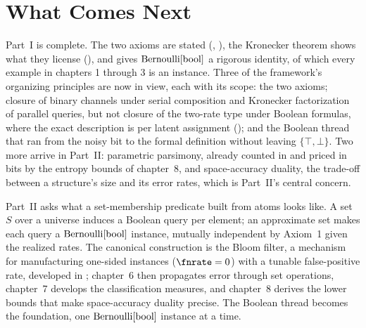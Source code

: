 %

\section{What Comes Next}
\label{sec:what-comes-next}

Part~I is complete. The two axioms are stated (,
), the Kronecker theorem shows what they license
(), and  gives
$\mathrm{Bernoulli}[\mathrm{bool}]$ a rigorous identity, of which every example in chapters
1 through 3 is an instance. Three of the framework's organizing principles are
now in view, each with its scope: the two axioms; closure of binary channels
under serial composition and Kronecker factorization of parallel queries, but
not closure of the two-rate type under Boolean formulas, where the exact
description is per latent assignment (); and the
Boolean thread that ran from the noisy bit to the formal definition without
leaving $\{\top, \bot\}$. Two more arrive in Part~II:
parametric parsimony, already counted in
 and priced in bits by the entropy bounds of
chapter~8, and space-accuracy duality, the trade-off between a structure's size and its
error rates, which is Part~II's central concern.

Part~II asks what a set-membership predicate built from atoms looks like. A set
$S$ over a universe induces a Boolean query per element; an approximate
set makes each query a $\mathrm{Bernoulli}[\mathrm{bool}]$
instance, mutually independent by Axiom~1 given the realized rates. The canonical construction is the Bloom filter, a mechanism for
manufacturing one-sided instances ($\fnrate = 0$) with a tunable false-positive
rate, developed in ; chapter~6 then propagates error
through set operations, chapter~7 develops the classification measures, and
chapter~8 derives the lower bounds that make space-accuracy duality precise. The
Boolean thread becomes the foundation, one $\mathrm{Bernoulli}[\mathrm{bool}]$ instance at a
time.
